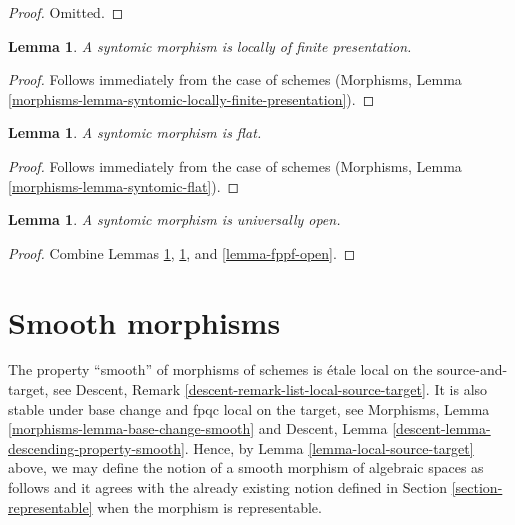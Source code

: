 \documentclass{stacks-project}
\theoremstyle{plain}
\newtheorem{lemma}[subsection]{Lemma}
\theoremstyle{definition}
\theoremstyle{remark}
\numberwithin{equation}{subsection}
\begin{document}
\begin{proof}
Omitted.
\end{proof}

\begin{lemma}
\label{lemma-syntomic-locally-finite-presentation}
A syntomic morphism is locally of finite presentation.
\end{lemma}

\begin{proof}
Follows immediately from the case of schemes
(Morphisms, Lemma \ref{morphisms-lemma-syntomic-locally-finite-presentation}).
\end{proof}

\begin{lemma}
\label{lemma-syntomic-flat}
A syntomic morphism is flat.
\end{lemma}

\begin{proof}
Follows immediately from the case of schemes
(Morphisms, Lemma \ref{morphisms-lemma-syntomic-flat}).
\end{proof}

\begin{lemma}
\label{lemma-syntomic-open}
A syntomic morphism is universally open.
\end{lemma}

\begin{proof}
Combine
Lemmas \ref{lemma-syntomic-locally-finite-presentation},
\ref{lemma-syntomic-flat}, and
\ref{lemma-fppf-open}.
\end{proof}





\section{Smooth morphisms}
\label{section-smooth}

\noindent
The property ``smooth'' of morphisms of schemes is
\'etale local on the source-and-target, see
Descent, Remark \ref{descent-remark-list-local-source-target}.
It is also stable under base change and fpqc local on the target, see
Morphisms, Lemma \ref{morphisms-lemma-base-change-smooth}
and
Descent, Lemma \ref{descent-lemma-descending-property-smooth}.
Hence, by
Lemma \ref{lemma-local-source-target}
above, we may define the notion of a smooth morphism of algebraic spaces as
follows and it agrees with the already existing notion defined in
Section \ref{section-representable}
when the morphism is representable.
\end{document}
